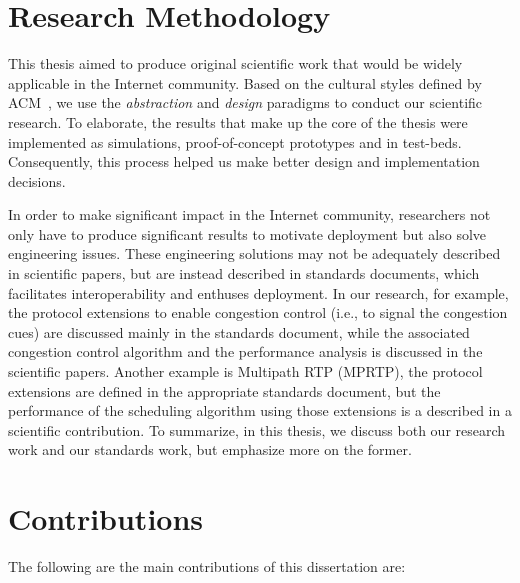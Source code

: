 \section{Research Methodology}

This thesis aimed to produce original scientific work that would be widely
applicable in the Internet community. Based on the cultural styles defined by
ACM~\cite{Denning:CS.Method}, we use the \textit{abstraction} and
\textit{design} paradigms to conduct our scientific research. To elaborate,
the results that make up the core of the thesis were implemented as
simulations, proof-of-concept prototypes and in test-beds. Consequently, this
process helped us make better design and implementation decisions.

In order to make significant impact in the Internet community, researchers not
only have to produce significant results to motivate deployment but also solve
engineering issues. These engineering solutions may not be adequately
described in scientific papers, but are instead described in standards
documents, which facilitates interoperability and enthuses deployment. In our
research,  for example, the protocol extensions to enable congestion control
(i.e., to signal the congestion cues) are discussed mainly in the standards
document, while the associated congestion control algorithm and the
performance analysis is discussed in the scientific papers. Another example is
Multipath RTP (MPRTP), the protocol extensions are defined in the appropriate
standards document, but the performance of the scheduling algorithm using
those extensions is a described in a scientific contribution. To summarize, in
this thesis, we discuss both our research work and our standards work, but
emphasize more on the former.

\section{Contributions}

The following are the main contributions of this dissertation are:

